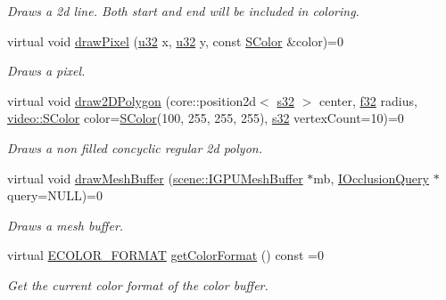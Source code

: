 \begin{DoxyCompactItemize}
\begin{DoxyCompactList}\small\item\em Draws a 2d line. Both start and end will be included in coloring. \end{DoxyCompactList}\item 
virtual void \hyperlink{classirr_1_1video_1_1IVideoDriver_a6567ced74ed6dc8cb1b325493ae7a093}{draw\+Pixel} (\hyperlink{namespaceirr_a0416a53257075833e7002efd0a18e804}{u32} x, \hyperlink{namespaceirr_a0416a53257075833e7002efd0a18e804}{u32} y, const \hyperlink{classirr_1_1video_1_1SColor}{S\+Color} \&color)=0
\begin{DoxyCompactList}\small\item\em Draws a pixel. \end{DoxyCompactList}\item 
virtual void \hyperlink{classirr_1_1video_1_1IVideoDriver_aaf1318379f3d70c9347cfa853b944ad4}{draw2\+D\+Polygon} (core\+::position2d$<$ \hyperlink{namespaceirr_ac66849b7a6ed16e30ebede579f9b47c6}{s32} $>$ center, \hyperlink{namespaceirr_a0277be98d67dc26ff93b1a6a1d086b07}{f32} radius, \hyperlink{classirr_1_1video_1_1SColor}{video\+::\+S\+Color} color=\hyperlink{classirr_1_1video_1_1SColor}{S\+Color}(100, 255, 255, 255), \hyperlink{namespaceirr_ac66849b7a6ed16e30ebede579f9b47c6}{s32} vertex\+Count=10)=0
\begin{DoxyCompactList}\small\item\em Draws a non filled concyclic regular 2d polyon. \end{DoxyCompactList}\item 
virtual void \hyperlink{classirr_1_1video_1_1IVideoDriver_a3f03e53661b1fc83d92cba4af7de6c70}{draw\+Mesh\+Buffer} (\hyperlink{classirr_1_1scene_1_1IGPUMeshBuffer}{scene\+::\+I\+G\+P\+U\+Mesh\+Buffer} $\ast$mb, \hyperlink{classirr_1_1video_1_1IOcclusionQuery}{I\+Occlusion\+Query} $\ast$query=N\+U\+LL)=0
\begin{DoxyCompactList}\small\item\em Draws a mesh buffer. \end{DoxyCompactList}\item 
virtual \hyperlink{namespaceirr_1_1video_a1d5e487888c32b1674a8f75116d829ed}{E\+C\+O\+L\+O\+R\+\_\+\+F\+O\+R\+M\+AT} \hyperlink{classirr_1_1video_1_1IVideoDriver_a9a4eaeebbeae43dc329b978a79d9e034}{get\+Color\+Format} () const  =0
\begin{DoxyCompactList}\small\item\em Get the current color format of the color buffer. \end{DoxyCompactList}\item 

\end{DoxyCompactItemize}
